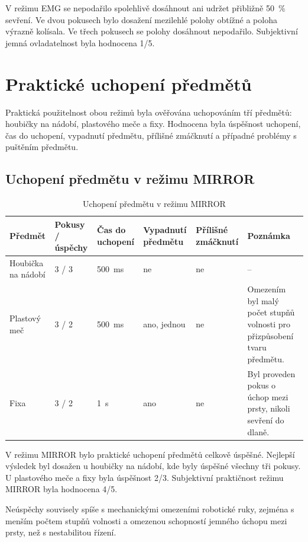 \documentclass[FZS,DP]{tulthesis}
\begin{document}
V režimu EMG se nepodařilo spolehlivě dosáhnout ani udržet přibližně 50~\% sevření. Ve dvou pokusech bylo dosažení mezilehlé polohy obtížné a poloha výrazně kolísala. Ve třech pokusech se polohy dosáhnout nepodařilo. Subjektivní jemná ovladatelnost byla hodnocena 1/5.

\section{Praktické uchopení předmětů}
\label{sec:uchopeni-predmetu}

Praktická použitelnost obou režimů byla ověřována uchopováním tří předmětů: houbičky na nádobí, plastového meče a fixy. Hodnocena byla úspěšnost uchopení, čas do uchopení, vypadnutí předmětu, přílišné zmáčknutí a případné problémy s puštěním předmětu.

\subsection{Uchopení předmětu v režimu MIRROR}
\label{subsec:uchopeni-mirror}

\begin{table}[H]
\centering
\caption{Uchopení předmětu v režimu MIRROR}
\label{tab:mirror-uchopeni}
\setlength{\tabcolsep}{2pt}
\begin{tabular}{|p{}|p{}|p{}|p{}|p{}|p{}|}
\hline
\textbf{Předmět} & \textbf{Pokusy / úspěchy} & \textbf{Čas do uchopení} & \textbf{Vypadnutí předmětu} & \textbf{Přílišné zmáčknutí} & \textbf{Poznámka} \\
\hline
Houbička na nádobí & 3 / 3 & 500~ms & ne & ne & -- \\
\hline
Plastový meč & 3 / 2 & 500~ms & ano, jednou & ne & Omezením byl malý počet stupňů volnosti pro přizpůsobení tvaru předmětu. \\
\hline
Fixa & 3 / 2 & 1~s & ano & ne & Byl proveden pokus o úchop mezi prsty, nikoli sevření do dlaně. \\
\hline
\end{tabular}
\end{table}

V režimu MIRROR bylo praktické uchopení předmětů celkově úspěšné. Nejlepší výsledek byl dosažen u houbičky na nádobí, kde byly úspěšné všechny tři pokusy. U plastového meče a fixy byla úspěšnost 2/3. Subjektivní praktičnost režimu MIRROR byla hodnocena 4/5.

Neúspěchy souvisely spíše s mechanickými omezeními robotické ruky, zejména s menším počtem stupňů volnosti a omezenou schopností jemného úchopu mezi prsty, než s nestabilitou řízení.
\end{document}
